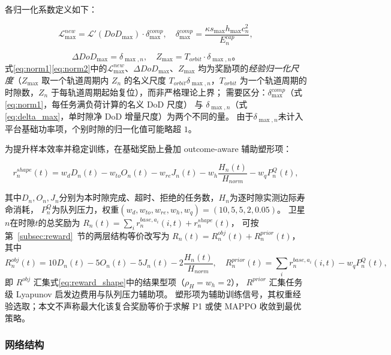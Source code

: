 \documentclass[a4paper,11pt]{article}
\begin{document}
各归一化系数定义如下：

\begin{equation}
\mathcal{L}^{new}_{\max} =
\mathcal{L}'(DoD_{\max})\cdot\delta^{comp}_{\max},
\quad
\delta^{comp}_{\max} = \frac{\kappa s_{\max} h_{\max} c^2_n}{E^{cap}_n},
\label{eq:norm1}
\end{equation}

\begin{equation}
\Delta DoD_{\max} = \delta_{\max,n},
\quad
Z_{\max} = T_{orbit}\cdot\delta_{\max,n}。
\label{eq:norm2}
\end{equation}
式\eqref{eq:norm1}\eqref{eq:norm2}中的$\mathcal{L}^{new}_{\max}$、$\Delta DoD_{\max}$、$Z_{\max}$
均为奖励项的\emph{经验归一化尺度}（$Z_{\max}$ 取一个轨道周期内 $Z_n$ 的名义尺度
$T_{orbit}\delta_{\max,n}$，$T_{orbit}$ 为一个轨道周期的时隙数，$Z_n$ 于每轨道周期起始复位），而非严格理论上界；
需要区分：$\delta^{comp}_{\max}$（式\eqref{eq:norm1}，每任务满负荷计算的名义 DoD 尺度）
与 $\delta_{\max,n}$（式\eqref{eq:delta_max}，单时隙净 DoD 增量尺度）为两个不同的量。
由于$\delta_{\max,n}$未计入平台基础功率项，个别时隙的归一化值可能略超 $1$。

为提升样本效率并稳定训练，在基础奖励上叠加 outcome-aware 辅助塑形项：

\begin{equation}
r^{shape}_n(t) = w_d D_n(t) - w_{to} O_n(t) - w_{re} J_n(t)
- w_h \frac{H_n(t)}{H_{norm}} - w_q P^{Q}_n(t),
\label{eq:reward_shape}
\end{equation}

其中$D_n, O_n, J_n$分别为本时隙完成、超时、拒绝的任务数，$H_n$为逐时隙实测边际寿命消耗，
$P^Q_n$为队列压力，权重$(w_d, w_{to}, w_{re}, w_h, w_q) = (10, 5, 5, 2, 0.05)$。
卫星$n$在时隙$t$的总奖励为 $R_n(t) = \sum_i r^{base,a_i}_n(i,t) + r^{shape}_n(t)$，
可按第~\ref{subsec:reward}~节的两层结构等价改写为 $R_n(t)=R^{obj}_n(t)+R^{prior}_n(t)$，其中
\begin{equation}
R^{obj}_n(t) = 10 D_n(t) - 5 O_n(t) - 5 J_n(t) - 2\frac{H_n(t)}{H_{norm}},
\quad
R^{prior}_n(t) = \sum_i r^{base,a_i}_n(i,t) - w_q P^Q_n(t),
\label{eq:reward_twolayer}
\end{equation}
即 $R^{obj}$ 汇集式\eqref{eq:reward_shape}中的结果型项（$\rho_H=w_h=2$），
$R^{prior}$ 汇集任务级 Lyapunov 启发边费用与队列压力辅助项。
塑形项为辅助训练信号，其权重经验选取；本文不声称最大化该复合奖励等价于求解 P1 或使 MAPPO 收敛到最优策略。

\subsubsection{网络结构}
\end{document}
